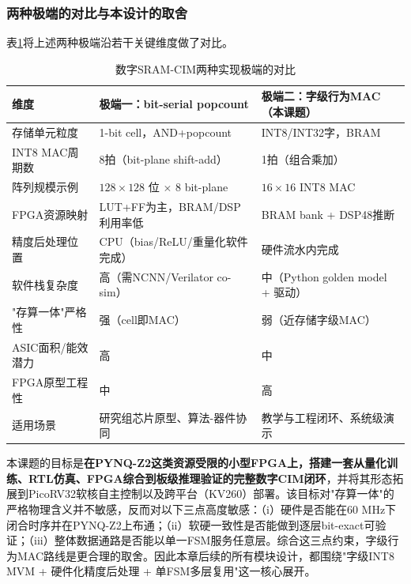 \documentclass[12pt, a4paper]{article}
\begin{document}
\subsubsection{两种极端的对比与本设计的取舍}

表\ref{tab:two_extremes}将上述两种极端沿若干关键维度做了对比。

\begin{table}[H]
	\centering
	\caption{数字SRAM-CIM两种实现极端的对比}
	\label{tab:two_extremes}
	\small
	\begin{tabular}{p{3.0cm}|p{5.0cm}|p{5.0cm}}
		\hline
		\textbf{维度} & \textbf{极端一：bit-serial popcount} & \textbf{极端二：字级行为MAC（本课题）} \\
		\hline
		存储单元粒度 & 1-bit cell，AND+popcount & INT8/INT32字，BRAM \\
		\hline
		INT8 MAC周期数 & 8拍（bit-plane shift-add） & 1拍（组合乘加） \\
		\hline
		阵列规模示例 & $128\times128$ 位 $\times$ 8 bit-plane & $16\times16$ INT8 MAC \\
		\hline
		FPGA资源映射 & LUT+FF为主，BRAM/DSP利用率低 & BRAM bank + DSP48推断 \\
		\hline
		精度后处理位置 & CPU（bias/ReLU/重量化软件完成） & 硬件流水内完成 \\
		\hline
		软件栈复杂度 & 高（需NCNN/Verilator co-sim） & 中（Python golden model + 驱动） \\
		\hline
		"存算一体"严格性 & 强（cell即MAC） & 弱（近存储字级MAC） \\
		\hline
		ASIC面积/能效潜力 & 高 & 中 \\
		\hline
		FPGA原型工程性 & 中 & 高 \\
		\hline
		适用场景 & 研究组芯片原型、算法-器件协同 & 教学与工程闭环、系统级演示 \\
		\hline
	\end{tabular}
\end{table}

本课题的目标是\textbf{在PYNQ-Z2这类资源受限的小型FPGA上，搭建一套从量化训练、RTL仿真、FPGA综合到板级推理验证的完整数字CIM闭环}，并将其形态拓展到PicoRV32软核自主控制以及跨平台（KV260）部署。该目标对"存算一体"的严格物理含义并不敏感，反而对以下三点高度敏感：（i）硬件是否能在60 MHz下闭合时序并在PYNQ-Z2上布通；（ii）软硬一致性是否能做到逐层bit-exact可验证；（iii）整体数据通路是否能以单一FSM服务任意层。综合这三点约束，字级行为MAC路线是更合理的取舍。因此本章后续的所有模块设计，都围绕"字级INT8 MVM + 硬件化精度后处理 + 单FSM多层复用"这一核心展开。
\end{document}
